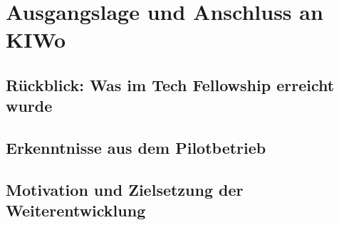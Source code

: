 \chapter{Ausgangslage und Anschluss an KIWo}

\section{Rückblick: Was im Tech Fellowship erreicht wurde}


\section{Erkenntnisse aus dem Pilotbetrieb}


\section{Motivation und Zielsetzung der Weiterentwicklung}


